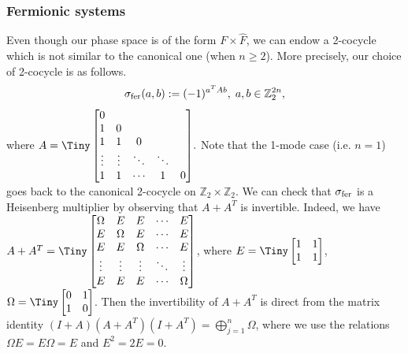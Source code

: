 \documentclass[12pt,reqno]{amsart}
\theoremstyle{definition}
\theoremstyle{definition}
\theoremstyle{definition}
\numberwithin{thm}{section}
\numberwithin{equation}{section}
\newcommand{\z}{\mathbb{Z}}
\newcommand{\Om}{\Omega}
\begin{document}
\subsubsection{Fermionic systems} \label{sec-fermions}
Even though our phase space is of the form $F\times \widehat{F}$, we can endow a 2-cocycle which is not similar to the canonical one (when $n\ge 2$). More precisely, our choice of 2-cocycle is as follows.
    \begin{equation}\label{eq-fer-2-cocycle}
       \sigma_{\rm fer}(a,b) := (-1)^{a^T A b},\; a,b \in \z^{2n}_2,
   \end{equation}
where $A={\Tiny \begin{bmatrix} 0 &&&\\ 1& 0&&\\1&1&0&\\ \vdots& \vdots& \ddots & \ddots & \\1 & 1 & \cdots & 1 & 0 \end{bmatrix}}.$ Note that the 1-mode case (i.e. $n=1$) goes back to the canonical 2-cocycle on $\z_2\times \z_2$. We can check that $\sigma_{\rm fer}$ is a Heisenberg multiplier by observing that $A+A^T$ is invertible. Indeed, we have $A+A^T={\Tiny \begin{bmatrix} \Om &E &E &\cdots &E \\ E &\Om &E &\cdots &E \\ E &E &\Om &\cdots & E \\ \vdots &\vdots &\vdots & \ddots &\vdots \\ E &E &E & \cdots &\Om \end{bmatrix}}$, where $E={\Tiny \begin{bmatrix} 1&1\\ 1&1 \end{bmatrix}}$, $\Om={\Tiny \begin{bmatrix} 0&1\\ 1&0 \end{bmatrix}}$. Then the invertibility of $A+A^T$ is direct from the matrix identity $(I+A)(A+A^T)(I+A^T)=\bigoplus^n_{j=1}\Om$, where we use the relations $\Om E=E\Om=E$ and $E^2=2E=0$.
\end{document}
